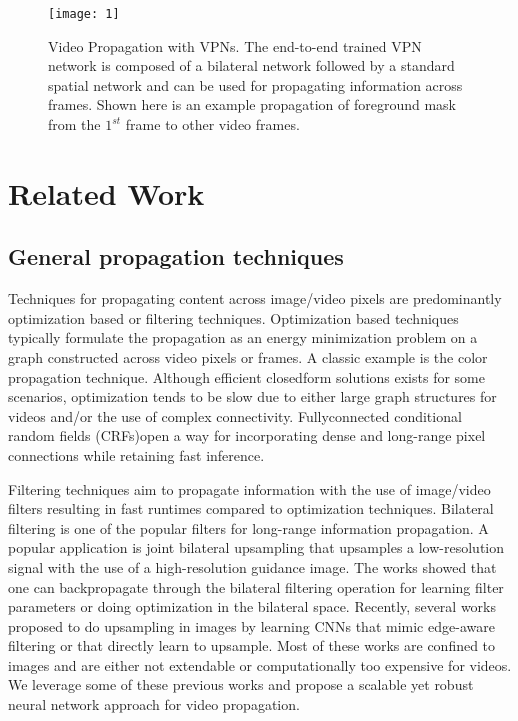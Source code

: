 \documentclass[10pt,twocolumn,letterpaper]{article}
\begin{document}
\begin{figure}[htbp]
\centering
\texttt{[image: 1]}
\caption{Video Propagation with VPNs. The end-to-end trained
VPN network is composed of a bilateral network followed by a
standard spatial network and can be used for propagating information
across frames. Shown here is an example propagation of
foreground mask from the $1^{st}$ frame to other video frames.}
\label{fig:1}
\end{figure}

\section{Related Work}
\subsection{General propagation techniques}
Techniques for propagating
content across image/video pixels are predominantly
optimization based or filtering techniques. Optimization
based techniques typically formulate the propagation as an
energy minimization problem on a graph constructed across
video pixels or frames. A classic example is the color propagation
technique. Although efficient closedform
solutions\cite{Levin2007A} exists for some scenarios, optimization
tends to be slow due to either large graph structures
for videos and/or the use of complex connectivity. Fullyconnected
conditional random fields (CRFs)open a
way for incorporating dense and long-range pixel connections
while retaining fast inference.

Filtering techniques\cite{Chang2015Propagated}\cite{He2013Guided} aim to propagate information
with the use of image/video filters resulting in fast
runtimes compared to optimization techniques. Bilateral filtering is one of the popular filters for long-range information
propagation. A popular application is joint bilateral
upsampling that upsamples a low-resolution signal
with the use of a high-resolution guidance image. The
works showed that one can backpropagate
through the bilateral filtering operation for learning
filter parameters or doing optimization in the
bilateral space. Recently, several works proposed
to do upsampling in images by learning CNNs that mimic
edge-aware filtering\cite{Xu2015Deep} or that directly learn to upsample. Most of these works are confined to images
and are either not extendable or computationally too expensive
for videos. We leverage some of these previous works
and propose a scalable yet robust neural network approach
for video propagation.
\end{document}
